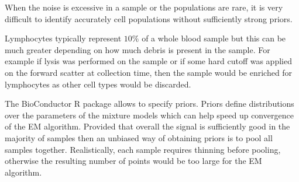When the noise is excessive in a sample or the populations are rare, it is very difficult to identify accurately cell populations without sufficiently strong priors.

Lymphocytes typically represent $10\%$ of a whole blood sample but this can be much greater depending on how much debris is present in the sample.
For example if lysis was performed on the sample or if some hard cutoff was applied on the forward scatter at collection time,
then the sample would be enriched for lymphocytes as other cell types would be discarded.


The  BioConductor R package \citet{Lo:2008it} allows to specify priors.
Priors define distributions over the parameters of the mixture models which can help speed up convergence of the EM algorithm.
Provided that overall the signal is sufficiently good in the majority of samples then an unbiased way of obtaining priors is to pool all samples together.
Realistically, each sample requires thinning before pooling, otherwise the resulting number of points would be too large for the EM algorithm.








